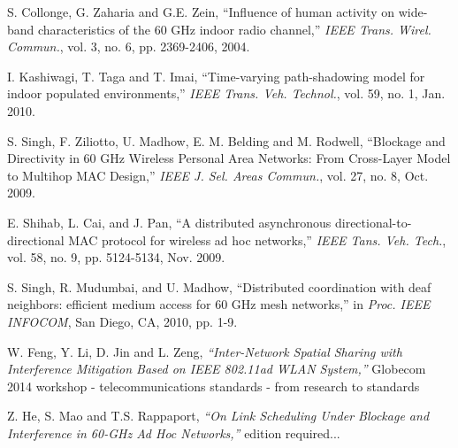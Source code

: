\documentclass[10pt, conference, letterpaper]{IEEEtran}
\begin{document}
\begin{thebibliography}{50}
S. Collonge, G. Zaharia and G.E. Zein, ``Influence of human activity on wide-band characteristics of the 60 GHz indoor radio channel,'' \emph{IEEE Trans. Wirel. Commun.}, vol. 3,  no. 6, pp. 2369-2406, 2004.

I. Kashiwagi, T. Taga and T. Imai, ``Time-varying path-shadowing model for indoor populated environments,'' \emph{IEEE Trans. Veh. Technol.}, vol. 59, no. 1, Jan. 2010.

S. Singh, F. Ziliotto, U. Madhow, E. M. Belding and M. Rodwell, ``Blockage and Directivity in 60 GHz Wireless Personal Area Networks: From Cross-Layer Model to Multihop MAC Design,'' \emph{IEEE J. Sel. Areas Commun.}, vol. 27, no. 8, Oct. 2009.




E. Shihab, L. Cai, and J. Pan, ``A distributed asynchronous directional-to-directional MAC protocol for wireless ad hoc networks,'' \emph{IEEE Tans. Veh. Tech.}, vol. 58, no. 9, pp. 5124-5134, Nov. 2009. 

S. Singh, R. Mudumbai, and U. Madhow, ``Distributed coordination with deaf neighbors: efficient medium access for 60 GHz mesh networks,'' in \emph{Proc. IEEE INFOCOM}, San Diego, CA, 2010, pp. 1-9.


W. Feng, Y. Li, D. Jin and L. Zeng, \emph{``Inter-Network Spatial Sharing with Interference Mitigation Based on IEEE 802.11ad WLAN System,''} Globecom 2014 workshop - telecommunications standards - from research to standards


Z. He, S. Mao and T.S. Rappaport, \emph{``On Link Scheduling Under Blockage and Interference in 60-GHz Ad Hoc Networks,''} edition required...




\end{thebibliography}
\end{document}
